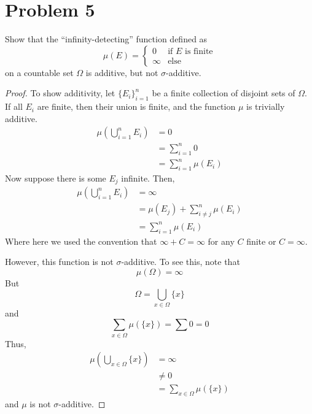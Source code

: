\documentclass[fontsize=11pt]{scrartcl} %
\numberwithin{equation}{section} %
\numberwithin{figure}{section} %
\numberwithin{table}{section} %
\begin{document}
\section*{Problem 5}
Show that the ``infinity-detecting'' function defined as
\[
\mu(E) = 
\begin{cases}
0 &\textrm{if } E \textrm{ is finite}\\
\infty &\textrm{else}
\end{cases}
\]
on a countable set $\Omega$ is additive, but not $\sigma$-additive.
\\
\begin{proof}
To show additivity, let $\{E_i\}_{i=1}^n$ be a finite collection of disjoint sets of $\Omega$.
If all $E_i$ are finite, then their union is finite, and the function $\mu$ is trivially
additive.
\[
\begin{aligned}
\mu\left(\bigcup_{i=1}^n E_i\right) &= 0\\
                                    &= \sum_{i=1}^n 0\\
                                    &= \sum_{i=1}^n \mu(E_i)
\end{aligned}
\]
Now suppose there is some $E_j$ infinite. Then,
\[
\begin{aligned}
\mu\left(\bigcup_{i=1}^n E_i\right) &= \infty\\
                                    &= \mu(E_j) + \sum_{i\neq j}^n \mu(E_i)\\
                                    &= \sum_{i=1}^n \mu(E_i)
\end{aligned}
\]
Where here we used the convention that $\infty + C = \infty$ for any $C$ finite or $C=\infty$.

However, this function is not $\sigma$-additive. To see this, note that
\[
\mu(\Omega) = \infty
\]
But 
\[
\Omega = \bigcup_{x\in\Omega}\{x\}
\]
and 
\[
\sum_{x\in\Omega}\mu(\{x\}) = \sum 0 = 0
\]
Thus,
\[
\begin{aligned}
\mu\left(\bigcup_{x\in\Omega}\{x\}\right)   &= \infty\\
                                            &\neq 0\\
                                            &= \sum_{x\in\Omega}\mu(\{x\})
\end{aligned}
\]
and $\mu$ is not $\sigma$-additive.
\end{proof}
\end{document}
